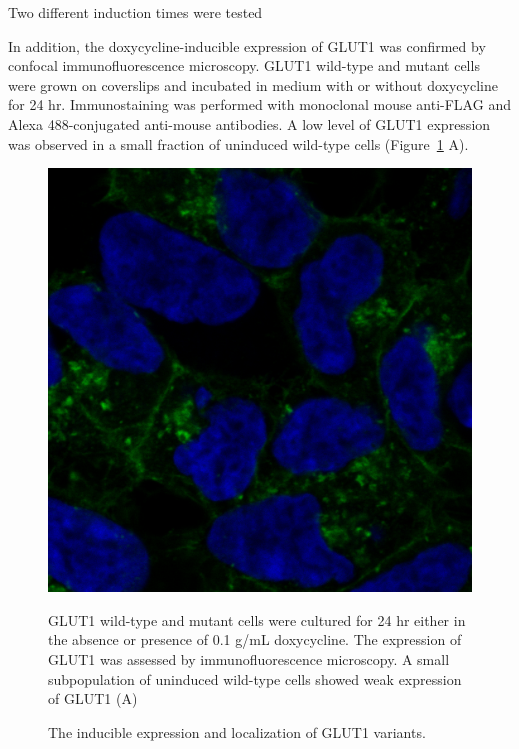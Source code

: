 Two different induction times were tested


In addition, the doxycycline-inducible expression of GLUT1 was confirmed by confocal immunofluorescence microscopy. GLUT1 wild-type and mutant cells were grown on coverslips and incubated in medium with or without doxycycline for 24 hr. Immunostaining was performed with monoclonal mouse anti-FLAG and Alexa 488-conjugated anti-mouse antibodies. A low level of GLUT1 expression was observed in a small fraction of uninduced wild-type cells (Figure~\ref{fig:IF} A).
\begin{figure}[h]
\centering
\includegraphics[scale=0.2]{Figures/induction_IF}
\caption{The inducible expression and localization of GLUT1 variants.}
\medskip
\small \raggedright
GLUT1 wild-type and mutant cells were cultured for 24 hr either in the absence or presence of 0.1 {}\textmu g/mL doxycycline. The expression of GLUT1 was assessed by immunofluorescence microscopy. A small subpopulation of uninduced wild-type cells showed weak expression of GLUT1 (A)
\label{fig:IF}
\end{figure}
